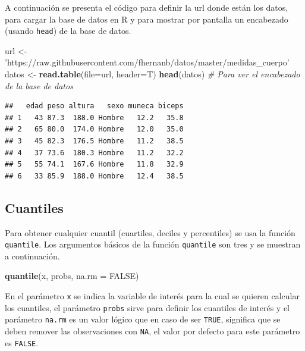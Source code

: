 \documentclass[10pt,]{krantz}
\makeatletter
\newenvironment{Shaded}{\begin{snugshade}}{\end{snugshade}}
\newcommand{\KeywordTok}[1]{\textcolor[rgb]{0.13,0.29,0.53}{\textbf{#1}}}
\newcommand{\DataTypeTok}[1]{\textcolor[rgb]{0.13,0.29,0.53}{#1}}
\newcommand{\StringTok}[1]{\textcolor[rgb]{0.31,0.60,0.02}{#1}}
\newcommand{\CommentTok}[1]{\textcolor[rgb]{0.56,0.35,0.01}{\textit{#1}}}
\newcommand{\OtherTok}[1]{\textcolor[rgb]{0.56,0.35,0.01}{#1}}
\newcommand{\NormalTok}[1]{#1}
\newenvironment{kframe}{%
\medskip{}
\setlength{\fboxsep}{.8em}
 \def\at@end@of@kframe{}%
 \ifinner\ifhmode%
  \def\at@end@of@kframe{\end{minipage}}%
  \begin{minipage}{\columnwidth}%
 \fi\fi%
 \def\FrameCommand##1{\hskip\@totalleftmargin \hskip-\fboxsep
 \colorbox{shadecolor}{##1}\hskip-\fboxsep
     \hskip-\linewidth \hskip-\@totalleftmargin \hskip\columnwidth}%
 \MakeFramed {\advance\hsize-\width
   \@totalleftmargin\z@ \linewidth\hsize
   \@setminipage}}%
 {\par\unskip\endMakeFramed%
 \at@end@of@kframe}
\renewenvironment{Shaded}{\begin{kframe}}{\end{kframe}}
\makeatother
\begin{document}
A continuación se presenta el código para definir la url donde están los
datos, para cargar la base de datos en R y para mostrar por pantalla un
encabezado (usando \texttt{head}) de la base de datos.

\begin{Shaded}
\begin{Highlighting}[]
\NormalTok{url <-}\StringTok{ 'https://raw.githubusercontent.com/fhernanb/datos/master/medidas_cuerpo'}
\NormalTok{datos <-}\StringTok{ }\KeywordTok{read.table}\NormalTok{(}\DataTypeTok{file=}\NormalTok{url, }\DataTypeTok{header=}\NormalTok{T)}
\KeywordTok{head}\NormalTok{(datos)  }\CommentTok{# Para ver el encabezado de la base de datos}
\end{Highlighting}
\end{Shaded}

\begin{verbatim}
##   edad peso altura   sexo muneca biceps
## 1   43 87.3  188.0 Hombre   12.2   35.8
## 2   65 80.0  174.0 Hombre   12.0   35.0
## 3   45 82.3  176.5 Hombre   11.2   38.5
## 4   37 73.6  180.3 Hombre   11.2   32.2
## 5   55 74.1  167.6 Hombre   11.8   32.9
## 6   33 85.9  188.0 Hombre   12.4   38.5
\end{verbatim}

\subsection{\texorpdfstring{Cuantiles  
 
}{Cuantiles     }}\label{cuantiles}

Para obtener cualquier cuantil (cuartiles, deciles y percentiles) se usa
la función \texttt{quantile}. Los argumentos básicos de la función
\texttt{quantile} son tres y se muestran a continuación.

\begin{Shaded}
\begin{Highlighting}[]
\KeywordTok{quantile}\NormalTok{(x, probs, }\DataTypeTok{na.rm =} \OtherTok{FALSE}\NormalTok{)}
\end{Highlighting}
\end{Shaded}

En el parámetro \texttt{x} se indica la variable de interés para la cual
se quieren calcular los cuantiles, el parámetro \texttt{probs} sirve
para definir los cuantiles de interés y el parámetro \texttt{na.rm} es
un valor lógico que en caso de ser \texttt{TRUE}, significa que se deben
remover las observaciones con \texttt{NA}, el valor por defecto para
este parámetro es \texttt{FALSE}.
\end{document}
